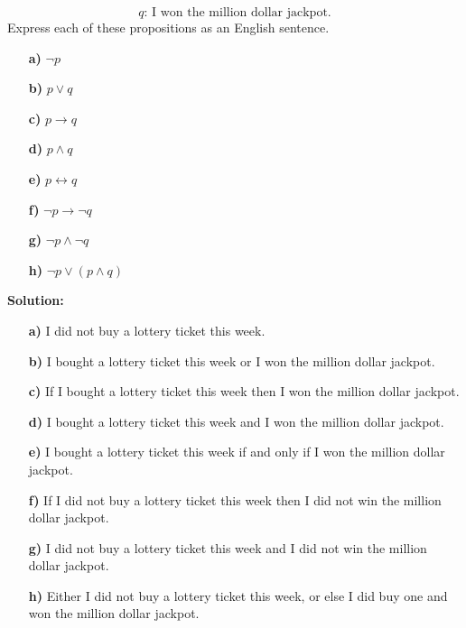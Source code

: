 \documentclass{Axon}
\begin{document}
\begin{equation*}
    q\text{: I won the million dollar jackpot.}
\end{equation*}
Express each of these propositions as an English sentence.
\begin{enumerate}
    \item[\textbf{a)}] \(\lnot p\)
    \item[\textbf{b)}] \(p \lor q\)
    \item[\textbf{c)}] \(p \to q\)
    \item[\textbf{d)}] \(p \land q\)
    \item[\textbf{e)}] \(p \leftrightarrow q\)
    \item[\textbf{f)}] \(\lnot p \to \lnot q\)
    \item[\textbf{g)}] \(\lnot p \land \lnot q\)
    \item[\textbf{h)}] \(\lnot p \lor (p \land q)\)
\end{enumerate}

\noindent
\textbf{Solution:}
\begin{enumerate}
    \item[\textbf{a)}] I did not buy a lottery ticket this week.
    \item[\textbf{b)}] I bought a lottery ticket this week or I won the million dollar jackpot.
    \item[\textbf{c)}] If I bought a lottery ticket this week then I won the million dollar jackpot.
    \item[\textbf{d)}] I bought a lottery ticket this week and I won the million dollar jackpot.
    \item[\textbf{e)}] I bought a lottery ticket this week if and only if I won the million dollar jackpot.
    \item[\textbf{f)}] If I did not buy a lottery ticket this week then I did not win the million dollar jackpot.
    \item[\textbf{g)}] I did not buy a lottery ticket this week and I did not win the million dollar jackpot.
    \item[\textbf{h)}] Either I did not buy a lottery ticket this week, or else I did buy one and won the million dollar jackpot.
\end{enumerate}
\end{document}

